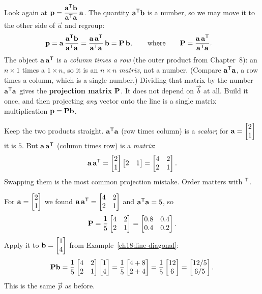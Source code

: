 Look again at $\mathbf{p} = \dfrac{\mathbf{a}^{\mathsf{T}}\mathbf{b}}{\mathbf{a}^{\mathsf{T}}\mathbf{a}}\,\mathbf{a}$. The quantity
$\mathbf{a}^{\mathsf{T}}\mathbf{b}$ is a number, so we may move it to the other side of $\vec{a}$ and regroup:
\begin{align*}
  \mathbf{p} &= \mathbf{a}\,\frac{\mathbf{a}^{\mathsf{T}}\mathbf{b}}{\mathbf{a}^{\mathsf{T}}\mathbf{a}}
           = \frac{\mathbf{a}\,\mathbf{a}^{\mathsf{T}}}{\mathbf{a}^{\mathsf{T}}\mathbf{a}}\,\mathbf{b}
           = \mathbf{P}\,\mathbf{b},
  \qquad\text{where}\qquad
  \mathbf{P} = \frac{\mathbf{a}\,\mathbf{a}^{\mathsf{T}}}{\mathbf{a}^{\mathsf{T}}\mathbf{a}}.
\end{align*}
The object $\mathbf{a}\,\mathbf{a}^{\mathsf{T}}$ is a \emph{column times a row} (the outer product from Chapter~8):
an $n\times1$ times a $1\times n$, so it is an $n\times n$ \emph{matrix}, not a number. (Compare
$\mathbf{a}^{\mathsf{T}}\mathbf{a}$, a row times a column, which is a single number.) Dividing that matrix by the
number $\mathbf{a}^{\mathsf{T}}\mathbf{a}$ gives the \textbf{projection matrix} $\mathbf{P}$. It does not depend on
$\vec{b}$ at all. Build it once, and then projecting \emph{any} vector onto the line is a single
matrix multiplication $\mathbf{p}=\mathbf{P}\mathbf{b}$.

\begin{trapbox}
Keep the two products straight. $\mathbf{a}^{\mathsf{T}}\mathbf{a}$ (row times column) is a \emph{scalar}; for
$\mathbf{a}=\begin{bmatrix}2\\1\end{bmatrix}$ it is $5$. But $\mathbf{a}\,\mathbf{a}^{\mathsf{T}}$ (column times row) is a \emph{matrix}:
\[
  \mathbf{a}\,\mathbf{a}^{\mathsf{T}} = \begin{bmatrix}2\\1\end{bmatrix}\begin{bmatrix}2 & 1\end{bmatrix}
  = \begin{bmatrix} 4 & 2 \\ 2 & 1\end{bmatrix}.
\]
Swapping them is the most common projection mistake. Order matters with $^{\mathsf{T}}$.
\end{trapbox}

\begin{example}\label{ch18:line-Pmatrix}
For $\mathbf{a}=\begin{bmatrix}2\\1\end{bmatrix}$ we found $\mathbf{a}\,\mathbf{a}^{\mathsf{T}}=\begin{bmatrix}4&2\\2&1\end{bmatrix}$ and
$\mathbf{a}^{\mathsf{T}}\mathbf{a}=5$, so
\[
  \mathbf{P} = \frac{1}{5}\begin{bmatrix} 4 & 2 \\ 2 & 1\end{bmatrix}
          = \begin{bmatrix} 0.8 & 0.4 \\ 0.4 & 0.2 \end{bmatrix}.
\]
Apply it to $\mathbf{b}=\begin{bmatrix}1\\4\end{bmatrix}$ from Example~\ref{ch18:line-diagonal}:
\[
  \mathbf{P}\mathbf{b} = \frac{1}{5}\begin{bmatrix}4&2\\2&1\end{bmatrix}\begin{bmatrix}1\\4\end{bmatrix}
  = \frac{1}{5}\begin{bmatrix}4+8\\2+4\end{bmatrix} = \frac{1}{5}\begin{bmatrix}12\\6\end{bmatrix} = \begin{bmatrix}12/5\\6/5\end{bmatrix}.
\]
This is the same $\vec{p}$ as before.
\end{example}

